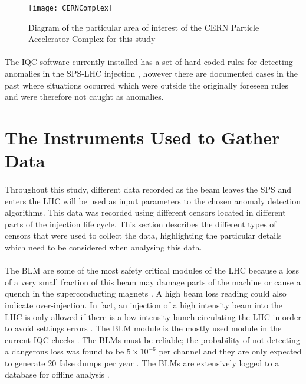 \begin{figure}[t]
	\centering
	\texttt{[image: CERNComplex]}
	\caption[The CERN Particle Accelerator Complex]{Diagram of the particular area of interest of the CERN Particle Accelerator Complex for this study}
	\label{fig::SPStoLHCInjection}
\end{figure}

\paragraph{ }The \ac{IQC} software currently installed has a set of hard-coded rules for detecting anomalies in the \acs{SPS}-\acs{LHC} injection \cite{Drosdal2011}, however there are documented cases in the past where situations occurred which were outside the originally foreseen rules and were therefore not caught as anomalies.

\section{The Instruments Used to Gather Data}
\paragraph{ }Throughout this study, different data recorded as the beam leaves the \acs{SPS} and enters the \acs{LHC} will be used as input parameters to the chosen anomaly detection algorithms. This data was recorded using different censors located in different parts of the injection life cycle. This section describes the different types of censors that were used to collect the data, highlighting the particular details which need to be considered when analysing this data.

\paragraph{ }The \ac{BLM} are some of the most safety critical modules of the \acs{LHC} because a loss of a very small fraction of this beam may damage parts of the machine or cause a quench in the superconducting magnets \cite{Holzer2006}. A high beam loss reading could also indicate over-injection. In fact, an injection of a high intensity beam into the LHC is only allowed if there is a low intensity bunch circulating the LHC in order to avoid settings errors \cite{Kain2010}. The \acs{BLM} module is the mostly used module in the current IQC checks \cite{Drosdal2011}. The \acs{BLM}s must be reliable; the probability of not detecting a dangerous loss was found to be $5\times10^{-6}$ per channel and they are only expected to generate 20 false dumps per year \cite{Holzer2006}. The \acs{BLM}s are extensively logged to a database for offline analysis \cite{Holzer2006}. 

